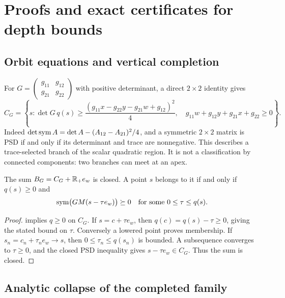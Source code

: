 \section{Proofs and exact certificates for depth bounds}\label{dp:appendix}

\subsection{Orbit equations and vertical completion}

For $G=\left(\begin{smallmatrix}g_{11}&g_{12}\\g_{21}&g_{22}\end{smallmatrix}\right)$
with positive determinant, a direct $2\times2$ identity gives
\begin{equation}\label{dp:orbit-equation}
 C_G=\left\{s:\det G\,q(s)\ge
 \frac{(g_{11}x-g_{22}y-g_{21}w+g_{12})^2}{4},\quad
 g_{11}w+g_{12}y+g_{21}x+g_{22}\ge0\right\}.
\end{equation}
Indeed $\det\operatorname{sym} A=\det A-(A_{12}-A_{21})^2/4$, and a symmetric
$2\times2$ matrix is PSD if and only if its determinant and trace are
nonnegative. This describes a trace-selected branch of the scalar quadratic
region. It is not a classification by connected components: two branches
can meet at an apex.

\begin{lemma}\label{dp:completion-membership}
The sum $B_G=C_G+\mathbb R_+e_w$ is closed. A point $s$ belongs to it if and only if
$q(s)\ge0$ and
\begin{equation}\label{dp:lowering}
 \operatorname{sym}\bigl(GM(s-\tau e_w)\bigr)\succeq0
 \quad\text{for some }0\le\tau\le q(s).
\end{equation}
\end{lemma}

\begin{proof}
 implies $q\ge0$ on $C_G$.
If $s=c+\tau e_w$, then $q(c)=q(s)-\tau\ge0$, giving the stated
bound on $\tau$. Conversely a lowered point proves membership.
If $s_n=c_n+\tau_ne_w\to s$, then $0\le\tau_n\le q(s_n)$ is bounded.
A subsequence converges to $\tau\ge0$, and the closed PSD inequality gives
$s-\tau e_w\in C_G$. Thus the sum is closed.
\end{proof}

\subsection{Analytic collapse of the completed family}\label{dp:vanishing-proof}

